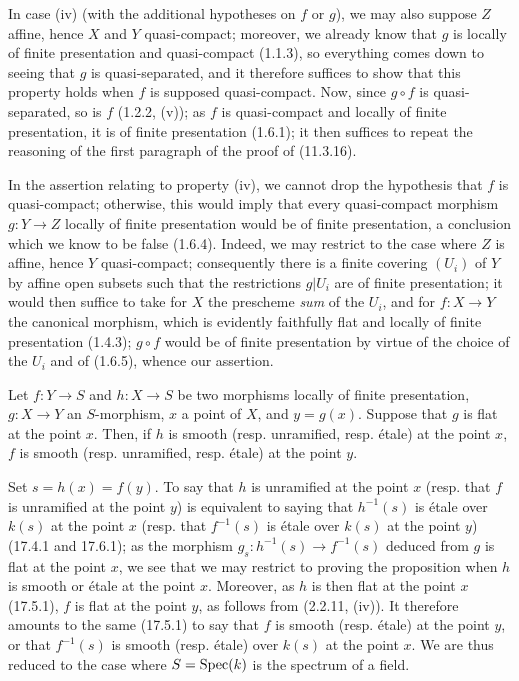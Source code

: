 In case (iv) (with the additional hypotheses on $f$ or $g$), we may also suppose $Z$ affine, hence $X$ and $Y$ quasi-compact; moreover, we already know that $g$ is locally of finite presentation and quasi-compact (1.1.3), so everything comes down to seeing that $g$ is quasi-separated, and it therefore suffices to show that this property holds when $f$ is supposed quasi-compact. Now, since $g\circ f$ is quasi-separated, so is $f$ (1.2.2, (v)); as $f$ is quasi-compact and locally of finite presentation, it is of finite presentation (1.6.1); it then suffices to repeat the reasoning of the first paragraph of the proof of (11.3.16).

\begin{remark}[17.7.6]
\label{IV.17.7.6}
In the assertion relating to property (iv), we cannot drop the hypothesis that $f$ is quasi-compact; otherwise, this would imply that every quasi-compact morphism $g:Y\to Z$ locally of finite presentation would be of finite presentation, a conclusion which we know to be false (1.6.4). Indeed, we may restrict to the case where $Z$ is affine, hence $Y$ quasi-compact; consequently there is a finite covering $(U_i)$ of $Y$ by affine open subsets such that the restrictions $g|U_i$ are of finite presentation; it would then suffice to take for $X$ the prescheme \emph{sum} of the $U_i$, and for $f:X\to Y$ the canonical morphism, which is evidently faithfully flat and locally of finite presentation (1.4.3); $g\circ f$ would be of finite presentation by virtue of the choice of the $U_i$ and of (1.6.5), whence our assertion.
\end{remark}

\begin{proposition}[17.7.7]
\label{IV.17.7.7}
Let $f:Y\to S$ and $h:X\to S$ be two morphisms locally of finite presentation, $g:X\to Y$ an $S$-morphism, $x$ a point of $X$, and $y=g(x)$. Suppose that $g$ is flat at the point $x$. Then, if $h$ is smooth (resp. unramified, resp. étale) at the point $x$, $f$ is smooth (resp. unramified, resp. étale) at the point $y$.
\end{proposition}

Set $s=h(x)=f(y)$. To say that $h$ is unramified at the point $x$ (resp. that $f$ is unramified at the point $y$) is equivalent to saying that $h^{-1}(s)$ is étale over $k(s)$ at the point $x$ (resp. that $f^{-1}(s)$ is étale over $k(s)$ at the point $y$) (17.4.1 and 17.6.1); as the morphism $g_s:h^{-1}(s)\to f^{-1}(s)$ deduced from $g$ is flat at the point $x$, we see that we may restrict to proving the proposition when $h$ is smooth or étale at the point $x$. Moreover, as $h$ is then flat at the point $x$ (17.5.1), $f$ is flat at the point $y$, as follows from (2.2.11, (iv)). It therefore amounts to the same (17.5.1) to say that $f$ is smooth (resp. étale) at the point $y$, or that $f^{-1}(s)$ is smooth (resp. étale) over $k(s)$ at the point $x$. We are thus reduced to the case where $S=\operatorname{Spec}(k)$ is the spectrum of a field.

